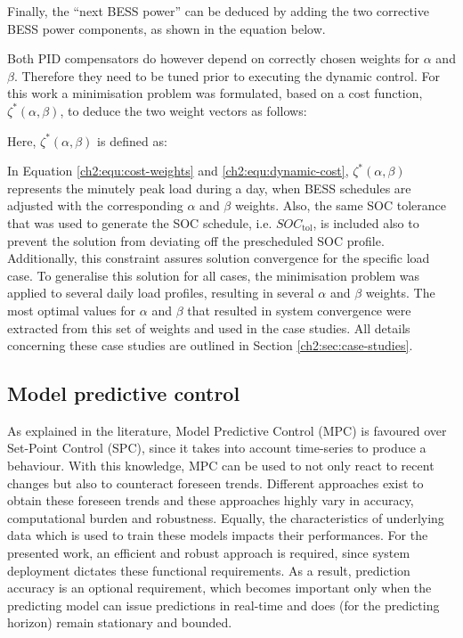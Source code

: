 Finally, the ``next BESS power'' can be deduced by adding the two corrective BESS power components, as shown in the equation below.



Both PID compensators do however depend on correctly chosen weights for $\alpha$ and $\beta$.
Therefore they need to be tuned prior to executing the dynamic control.
For this work a minimisation problem was formulated, based on a cost function, $\zeta^*(\alpha, \beta)$, to deduce the two weight vectors as follows:



Here, $\zeta^*(\alpha, \beta)$ is defined as:



In Equation \ref{ch2:equ:cost-weights} and \ref{ch2:equ:dynamic-cost}, $\zeta^*(\alpha, \beta)$ represents the minutely peak load during a day, when BESS schedules are adjusted with the corresponding $\alpha$ and $\beta$ weights.
Also, the same SOC tolerance that was used to generate the SOC schedule, i.e. $SOC_\text{tol}$, is included also to prevent the solution from deviating off the prescheduled SOC profile.
Additionally, this constraint assures solution convergence for the specific load case.
To generalise this solution for all cases, the minimisation problem was applied to several daily load profiles, resulting in several $\alpha$ and $\beta$ weights.
The most optimal values for $\alpha$ and $\beta$ that resulted in system convergence were extracted from this set of weights and used in the case studies.
All details concerning these case studies are outlined in Section \ref{ch2:sec:case-studies}.

\subsection{Model predictive control}

As explained in the literature, Model Predictive Control (MPC) is favoured over Set-Point Control (SPC), since it takes into account time-series to produce a behaviour.
With this knowledge, MPC can be used to not only react to recent changes but also to counteract foreseen trends.
Different approaches exist to obtain these foreseen trends and these approaches highly vary in accuracy, computational burden and robustness.
Equally, the characteristics of underlying data which is used to train these models impacts their performances.
For the presented work, an efficient and robust approach is required, since system deployment dictates these functional requirements.
As a result, prediction accuracy is an optional requirement, which becomes important only when the predicting model can issue predictions in real-time and does (for the predicting horizon) remain stationary and bounded.

